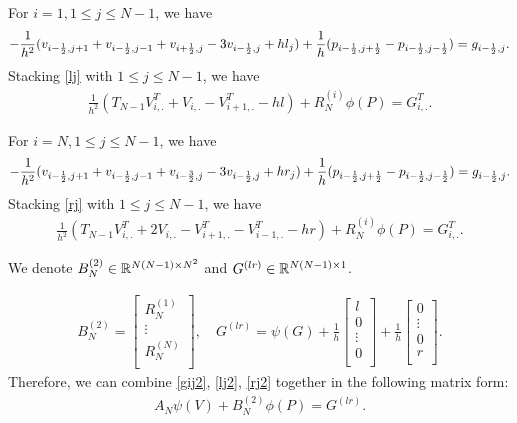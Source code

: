 \documentclass[english]{pkupaper}
\newenvironment{eqt}{\begin{equation}\begin{aligned}}{\end{aligned}\end{equation}}
\begin{document}
For $i=1, 1\leq j \leq N-1$, we have 
\begin{eqt}
\label{lj}
-\frac{1}{h^2}(v_{i-\oot,j+1}+v_{i-\oot,j-1}+v_{i+\oot,j }-3v_{i-\oot,j}+hl_j)+\frac{1}{h}(p_{i-\oot,j+\oot}-p_{i-\oot,j-\oot})=g_{i-\oot,j}.
\end{eqt}
Stacking \ref{lj} with $1\leq j\leq N-1$, we have
\begin{eqt}
\label{lj2}
\frac{1}{h^2}\left(T_{N-1}V_{i,.}^T+V_{i,.}-V_{i+1,.}^T-hl\right)+R_N^{(i)}\phi(P)=G_{i,.}^T.
\end{eqt}

For $i=N, 1\leq j \leq N-1$, we have 
\begin{eqt}
\label{rj}
-\frac{1}{h^2}(v_{i-\oot,j+1}+v_{i-\oot,j-1}+v_{i-\frac{3}{2},j }-3v_{i-\oot,j}+hr_j)+\frac{1}{h}(p_{i-\oot,j+\oot}-p_{i-\oot,j-\oot})=g_{i-\oot,j}
.\end{eqt}
Stacking \ref{rj} with $1\leq j\leq N-1$, we have
\begin{eqt}
\label{rj2}
\frac{1}{h^2}\left(T_{N-1}V_{i,.}^T+2V_{i,.}-V_{i+1,.}^T-V_{i-1,.}^T-hr\right)+R_N^{(i)}\phi(P)=G_{i,.}^T
.\end{eqt}

We denote $B_N^{(2)}\in\mathbb{R}^{N(N-1)\times N^2}$ and $G^{(lr)}\in \mathbb{R}^{N(N-1)\times1}$.

\begin{eqt}\label{bn2}
B_N^{(2)}=\begin{bmatrix}R_N^{(1)}\\
\vdots\\
R_N^{(N)}\\
\end{bmatrix},\quad G^{(lr)}=\psi(G)+\frac{1}{h}\begin{bmatrix}
l\\
0\\
\vdots\\
0\\
\end{bmatrix}+\frac{1}{h}\begin{bmatrix}
0\\
\vdots\\
0\\
r\\
\end{bmatrix}.
\end{eqt}
Therefore, we can combine \ref{gij2}, \ref{lj2}, \ref{rj2} together in the following matrix form:
\begin{eqt}
A_N\psi(V)+B_N^{(2)}\phi(P)=G^{(lr)}.
\end{eqt}
\end{document}
